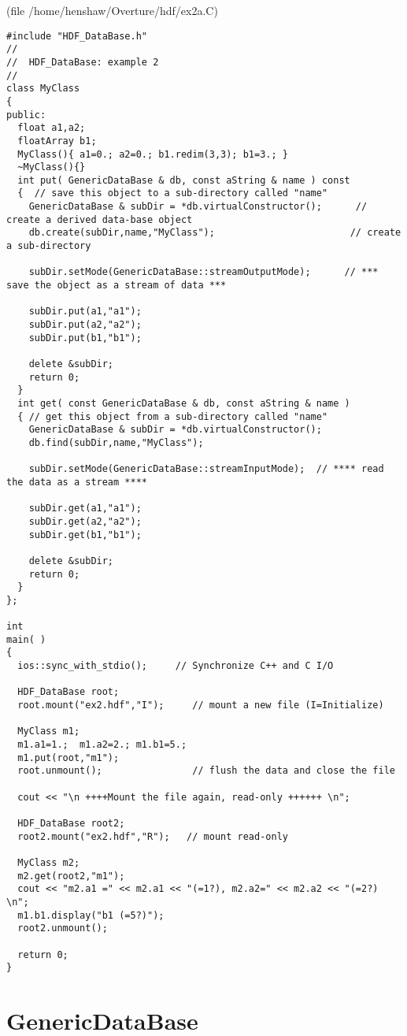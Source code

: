 \documentclass{article}
\begin{document}
(file {\ff /home/henshaw/Overture/hdf/ex2a.C})
{\footnotesize
\begin{verbatim}
#include "HDF_DataBase.h"
//
//  HDF_DataBase: example 2
//
class MyClass
{
public:
  float a1,a2;
  floatArray b1;
  MyClass(){ a1=0.; a2=0.; b1.redim(3,3); b1=3.; } 
  ~MyClass(){} 
  int put( GenericDataBase & db, const aString & name ) const
  {  // save this object to a sub-directory called "name"
    GenericDataBase & subDir = *db.virtualConstructor();      // create a derived data-base object
    db.create(subDir,name,"MyClass");                        // create a sub-directory 

    subDir.setMode(GenericDataBase::streamOutputMode);      // *** save the object as a stream of data ***

    subDir.put(a1,"a1");
    subDir.put(a2,"a2");
    subDir.put(b1,"b1");
 
    delete &subDir;
    return 0;
  }
  int get( const GenericDataBase & db, const aString & name ) 
  { // get this object from a sub-directory called "name"
    GenericDataBase & subDir = *db.virtualConstructor();
    db.find(subDir,name,"MyClass");

    subDir.setMode(GenericDataBase::streamInputMode);  // **** read the data as a stream ****

    subDir.get(a1,"a1");
    subDir.get(a2,"a2");
    subDir.get(b1,"b1");

    delete &subDir;
    return 0;
  }
};

int
main( ) 
{
  ios::sync_with_stdio();     // Synchronize C++ and C I/O 

  HDF_DataBase root;
  root.mount("ex2.hdf","I");     // mount a new file (I=Initialize)

  MyClass m1;
  m1.a1=1.;  m1.a2=2.; m1.b1=5.;
  m1.put(root,"m1");
  root.unmount();                // flush the data and close the file
    
  cout << "\n ++++Mount the file again, read-only ++++++ \n";

  HDF_DataBase root2;
  root2.mount("ex2.hdf","R");   // mount read-only

  MyClass m2;
  m2.get(root2,"m1");
  cout << "m2.a1 =" << m2.a1 << "(=1?), m2.a2=" << m2.a2 << "(=2?) \n";
  m1.b1.display("b1 (=5?)");
  root2.unmount();

  return 0;
}

\end{verbatim}
}

\section{GenericDataBase}
\end{document}
